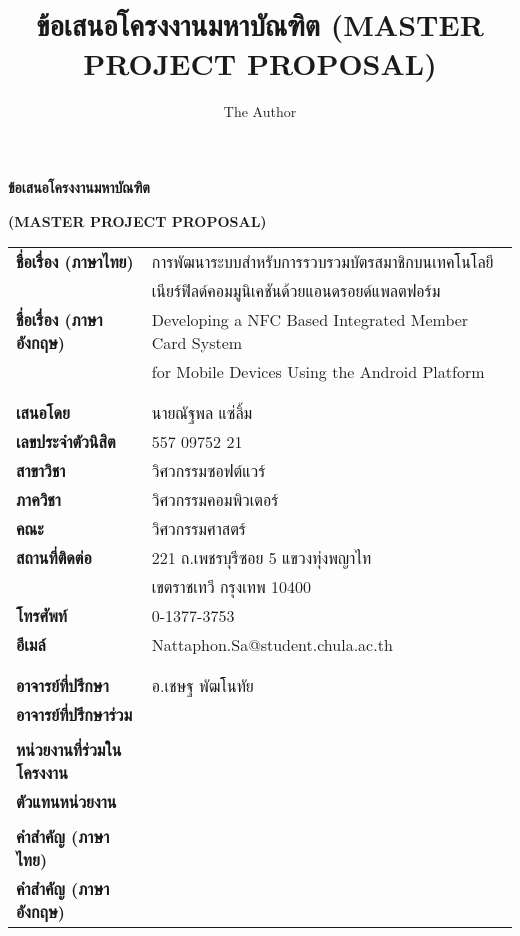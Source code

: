 \documentclass[a4paper]{article}
\title{ข้อเสนอโครงงานมหาบัณฑิต (MASTER PROJECT PROPOSAL)}
\author{The Author}
\begin{document}

\begin{center}
{\huge \bf ข้อเสนอโครงงานมหาบัณฑิต} 
\end{center}

\begin{center}
{\huge \bf (MASTER PROJECT PROPOSAL)} 
\end{center}

\vspace{1cm}
\Large{\noindent\hspace{0.7cm}\setlength{\tabcolsep}{15pt}
\begin{tabular}{l l}    
	\bf ชื่อเรื่อง (ภาษาไทย) 		& การพัฒนาระบบสำหรับการรวบรวมบัตรสมาชิกบนเทคโนโลยี \\
							& เนียร์ฟิลด์คอมมูนิเคชันด้วยแอนดรอยด์แพลตฟอร์ม \\
	\bf ชื่อเรื่อง (ภาษาอังกฤษ)		& Developing a NFC Based Integrated Member Card System \\
							& for Mobile Devices Using the Android Platform \\ 
							& \\
							& \\
	\bf เสนอโดย				& นายณัฐพล แซ่ลิ้ม \\
	\bf เลขประจำตัวนิสิต			& 557 09752 21 \\
	\bf สาขาวิชา				& วิศวกรรมซอฟต์แวร์ \\
	\bf ภาควิชา				& วิศวกรรมคอมพิวเตอร์ \\
	\bf คณะ					& วิศวกรรมศาสตร์ \\
	\bf สถานที่ติดต่อ				& 221 ถ.เพชรบุรีซอย 5 แขวงทุ่งพญาไท \\
							& เขตราชเทวี กรุงเทพ 10400 \\
	\bf โทรศัพท์				& 0-1377-3753 \\
	\bf อีเมล์					&  Nattaphon.Sa@student.chula.ac.th \\
							& \\
							& \\
	\bf อาจารย์ที่ปรึกษา			& อ.เชษฐ พัฒโนทัย \\
	\bf อาจารย์ที่ปรึกษาร่วม		& \\
							& \\
	\bf หน่วยงานที่ร่วมในโครงงาน	& \\
	\bf ตัวแทนหน่วยงาน			& \\
							& \\
	\bf คำสำคัญ (ภาษาไทย)		& \\
	\bf คำสำคัญ (ภาษาอังกฤษ)		& \\
\end{tabular}
}
\end{document}
